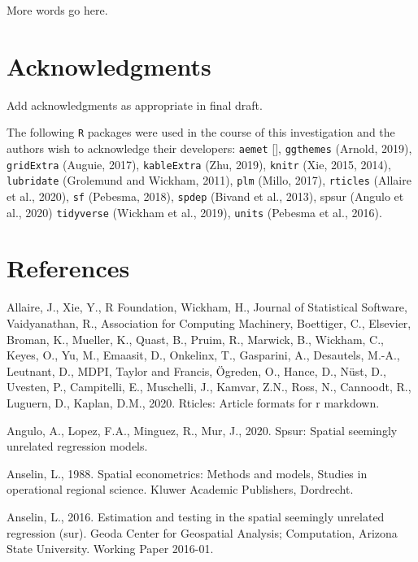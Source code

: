 \documentclass[]{elsarticle} %
\begin{document}
More words go here.

\hypertarget{acknowledgments}{%
\section*{Acknowledgments}\label{acknowledgments}}

Add acknowledgments as appropriate in final draft.

The following \texttt{R} packages were used in the course of this
investigation and the authors wish to acknowledge their developers:
\texttt{aemet} {[}{]}, \texttt{ggthemes} (Arnold, 2019),
\texttt{gridExtra} (Auguie, 2017), \texttt{kableExtra} (Zhu, 2019),
\texttt{knitr} (Xie, 2015, 2014), \texttt{lubridate} (Grolemund and
Wickham, 2011), \texttt{plm} (Millo, 2017), \texttt{rticles} (Allaire et
al., 2020), \texttt{sf} (Pebesma, 2018), \texttt{spdep} (Bivand et al.,
2013), spsur (Angulo et al., 2020) \texttt{tidyverse} (Wickham et al.,
2019), \texttt{units} (Pebesma et al., 2016).

\hypertarget{references}{%
\section*{References}\label{references}}

\hypertarget{refs}{}
\leavevmode\hypertarget{ref-Allaire2020}{}%
Allaire, J., Xie, Y., R Foundation, Wickham, H., Journal of Statistical
Software, Vaidyanathan, R., Association for Computing Machinery,
Boettiger, C., Elsevier, Broman, K., Mueller, K., Quast, B., Pruim, R.,
Marwick, B., Wickham, C., Keyes, O., Yu, M., Emaasit, D., Onkelinx, T.,
Gasparini, A., Desautels, M.-A., Leutnant, D., MDPI, Taylor and Francis,
Ögreden, O., Hance, D., Nüst, D., Uvesten, P., Campitelli, E.,
Muschelli, J., Kamvar, Z.N., Ross, N., Cannoodt, R., Luguern, D.,
Kaplan, D.M., 2020. Rticles: Article formats for r markdown.

\leavevmode\hypertarget{ref-Angulo2020spsur}{}%
Angulo, A., Lopez, F.A., Minguez, R., Mur, J., 2020. Spsur: Spatial
seemingly unrelated regression models.

\leavevmode\hypertarget{ref-Anselin1988spatial}{}%
Anselin, L., 1988. Spatial econometrics: Methods and models, Studies in
operational regional science. Kluwer Academic Publishers, Dordrecht.

\leavevmode\hypertarget{ref-Anselin2016estimation}{}%
Anselin, L., 2016. Estimation and testing in the spatial seemingly
unrelated regression (sur). Geoda Center for Geospatial Analysis;
Computation, Arizona State University. Working Paper 2016-01.
\end{document}
